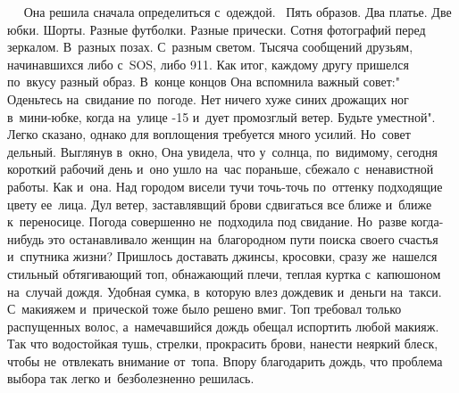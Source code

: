 ~
~Она решила сначала определиться с~одеждой.
~Пять образов.
Два платье.
Две юбки.
Шорты.
Разные футболки.
Разные прически.
Сотня фотографий перед зеркалом.
В~разных позах.
С~разным светом.
Тысяча сообщений друзьям, начинавшихся либо с~SOS, либо 911.
Как итог, каждому другу пришелся по~вкусу разный образ.
В~конце концов Она вспомнила важный совет:" Оденьтесь на~свидание по~погоде.
Нет ничего хуже синих дрожащих ног в~мини-юбке, когда на~улице -15 и~дует промозглый ветер.
Будьте уместной".
Легко сказано, однако для воплощения требуется много усилий.
Но~совет дельный.
Выглянув в~окно, Она увидела, что у~солнца, по~видимому, сегодня короткий рабочий день и~оно ушло на~час пораньше, сбежало с~ненавистной работы.
Как и~она.
Над городом висели тучи точь-точь по~оттенку подходящие цвету ее~лица.
Дул ветер, заставлявщий брови сдвигаться все ближе и~ближе к~переносице.
Погода совершенно не~подходила под свидание.
Но~разве когда-нибудь это останавливало женщин на~благородном пути поиска своего счастья и~спутника жизни? Пришлось доставать джинсы, кросовки, сразу же~нашелся стильный обтягивающий топ, обнажающий плечи, теплая куртка с~капюшоном на~случай дождя.
Удобная сумка, в~которую влез дождевик и~деньги на~такси.
С~макияжем и~прической тоже было решено вмиг.
Топ требовал только распущенных волос, а~намечавшийся дождь обещал испортить любой макияж.
Так что водостойкая тушь, стрелки, прокрасить брови, нанести неяркий блеск, чтобы не~отвлекать внимание от~топа.
Впору благодарить дождь, что проблема выбора так легко и~безболезненно решилась.

~

